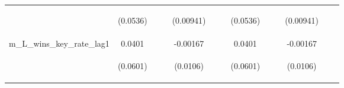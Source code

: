 \documentclass[]{article}
\begin{document}
\begin{center}
\begin{tabular}{lcccccccccccc}
\vspace{4pt} & \begin{footnotesize}(0.0536)\end{footnotesize} & \begin{footnotesize}\end{footnotesize} & \begin{footnotesize}\end{footnotesize} & \begin{footnotesize}(0.00941)\end{footnotesize} & \begin{footnotesize}\end{footnotesize} & \begin{footnotesize}\end{footnotesize} & \begin{footnotesize}(0.0536)\end{footnotesize} & \begin{footnotesize}\end{footnotesize} & \begin{footnotesize}\end{footnotesize} & \begin{footnotesize}(0.00941)\end{footnotesize} & \begin{footnotesize}\end{footnotesize} & \begin{footnotesize}\end{footnotesize} \\
m\_L\_wins\_key\_rate\_lag1 & 0.0401 &  &  & -0.00167 &  &  & 0.0401 &  &  & -0.00167 &  &  \\
\vspace{4pt} & \begin{footnotesize}(0.0601)\end{footnotesize} & \begin{footnotesize}\end{footnotesize} & \begin{footnotesize}\end{footnotesize} & \begin{footnotesize}(0.0106)\end{footnotesize} & \begin{footnotesize}\end{footnotesize} & \begin{footnotesize}\end{footnotesize} & \begin{footnotesize}(0.0601)\end{footnotesize} & \begin{footnotesize}\end{footnotesize} & \begin{footnotesize}\end{footnotesize} & \begin{footnotesize}(0.0106)\end{footnotesize} & \begin{footnotesize}\end{footnotesize} & \begin{footnotesize}\end{footnotesize} \\

\end{tabular}
\end{center}
\end{document}
